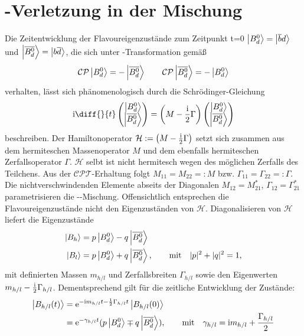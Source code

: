 \section{\CP-Verletzung in der Mischung}
Die Zeitentwicklung der Flavoureigenzustände zum Zeitpunkt t=0 $\Ket{\text{$B_d^0$}} = \Ket{\overline{b}d}$ und $\Ket{\text{$\overline{B_d^0}$}} = \Ket{b\overline{d}}$, die sich unter \CP-Transformation gemäß
\begin{align}
\text{$\mathcal{CP}$}\Ket{\text{$B_d^0$}} = -\Ket{\text{$\overline{B_d^0}$}} \qquad \text{$\mathcal{CP}$}\Ket{\text{$\overline{B_d^0}$}} = -\Ket{\text{$B_d^0$}}
\end{align} 
verhalten, lässt sich phänomenologisch durch die Schrödinger-Gleichung
\begin{align}
\im \diff{}{t}\begin{pmatrix} \Ket{\text{\Bd}} \\ \Ket{\text{\Bdbar}} \end{pmatrix} = \left(M - \frac{\im}{2} \Gamma\right) \begin{pmatrix} \Ket{\text{\Bd}} \\ \Ket{\text{\Bdbar}} \end{pmatrix}
\end{align}
beschreiben. Der Hamiltonoperator $\mathcal{H}:=\left(M - \frac{\mathrm{i}}{2} \Gamma\right)$ setzt sich zusammen aus dem hermiteschen Massenoperator $M$ und dem ebenfalls hermiteschen Zerfallsoperator $\Gamma$. $\mathcal{H}$ selbt ist nicht hermitesch wegen des möglichen Zerfalls des Teilchens. Aus der $\mathcal{CPT}$-Erhaltung folgt $M_{11}=M_{22}=:M$ bzw. $\Gamma_{11}=\Gamma_{22}=:\Gamma$. Die nichtverschwindenden Elemente abseits der Diagonalen $M_{12}=M_{21}^*$, $\Gamma_{12}=\Gamma_{21}^*$ parametrisieren die \Bd-\Bdbar-Mischung. Offensichtlich entsprechen die Flavoureigenzustände nicht den Eigenzuständen von $\mathcal{H}$. Diagonalisieren von $\mathcal{H}$ liefert die Eigenzustände
\begin{align}
\Ket{B_h} &= p \Ket{\text{$B_d^0$}} - q \Ket{\text{$\overline{B_d^0}$}} \label{eq:b_heavy}\\ 
\Ket{B_l} &= p \Ket{\text{$B_d^0$}} + q \Ket{\text{$\overline{B_d^0}$}}, \qquad \text{mit} \quad |p|^2 + |q|^2 = 1, \label{eq:b_light}
\end{align}
mit definierten Massen $m_{h/l}$ und Zerfallsbreiten $\Gamma_{h/l}$ sowie den Eigenwerten  $m_{h/l}-\frac{\mathrm{i}}{2}\Gamma_{h/l}$. Dementsprechend gilt für die zeitliche Entwicklung der Zustände:
\begin{align}
\nonumber \Ket{B_{h/l}(t)} &= \mathrm{e}^{-\mathrm{i} m_{h/l}t-\frac{1}{2}\Gamma_{h/l}t}\Ket{B_{h/l}(0)} \\
                           &= \mathrm{e}^{-\gamma_{h/l}t}(p\Ket{\text{$B_d^0$}} \mp q\Ket{\text{$\overline{B_d^0}$}}), \qquad
 \text{mit} \quad \gamma_{h/l} = \mathrm{i} m_{h/l}+\frac{\Gamma_{h/l}}{2}
\end{align}
